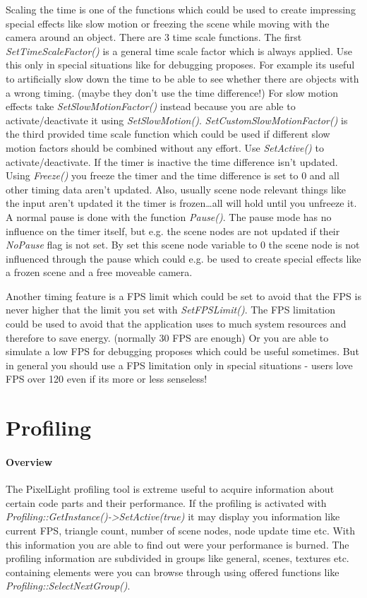 Scaling the time is one of the functions which could be used to create impressing special effects like slow motion or freezing the scene while moving with the camera around an object. There are 3 time scale functions. The first \emph{SetTimeScaleFactor()} is a general time scale factor which is always applied. Use this only in special situations like for debugging proposes. For example its useful to artificially slow down the time to be able to see whether there are objects with a wrong timing. (maybe they don't use the time difference!) For slow motion effects take \emph{SetSlowMotionFactor()} instead because you are able to activate/deactivate it using \emph{SetSlowMotion()}. \emph{SetCustomSlowMotionFactor()} is the third provided time scale function which could be used if different slow motion factors should be combined without any effort. Use \emph{SetActive()} to activate/deactivate. If the timer is inactive the time difference isn't updated. Using \emph{Freeze()} you freeze the timer and the time difference is set to 0 and all other timing data aren't updated. Also, usually scene node relevant things like the input aren't updated it the timer is frozen\ldots all will hold until you unfreeze it. A normal pause is done with the function \emph{Pause()}. The pause mode has no influence on the timer itself, but e.g. the scene nodes are not updated if their \emph{NoPause} flag is not set. By set this scene node variable to 0 the scene node is not influenced through the pause which could e.g. be used to create special effects like a frozen scene and a free moveable camera.

Another timing feature is a FPS limit which could be set to avoid that the FPS is never higher that the limit you set with \emph{SetFPSLimit()}. The FPS limitation could be used to avoid that the application uses to much system resources and therefore to save energy. (normally 30 FPS are enough) Or you are able to simulate a low FPS for debugging proposes which could be useful sometimes. But in general you should use a FPS limitation only in special situations - users love FPS over 120 even if its more or less senseless!





\section{Profiling}


\paragraph{Overview}
The PixelLight profiling tool is extreme useful to acquire information about certain code parts and their performance. If the profiling is activated with \emph{Profiling::GetInstance()->SetActive(true)} it may display you information like current FPS, triangle count, number of scene nodes, node update time etc. With this information you are able to find out were your performance is burned. The profiling information are subdivided in groups like general, scenes, textures etc. containing elements were you can browse through using offered functions like \emph{Profiling::SelectNextGroup()}.


